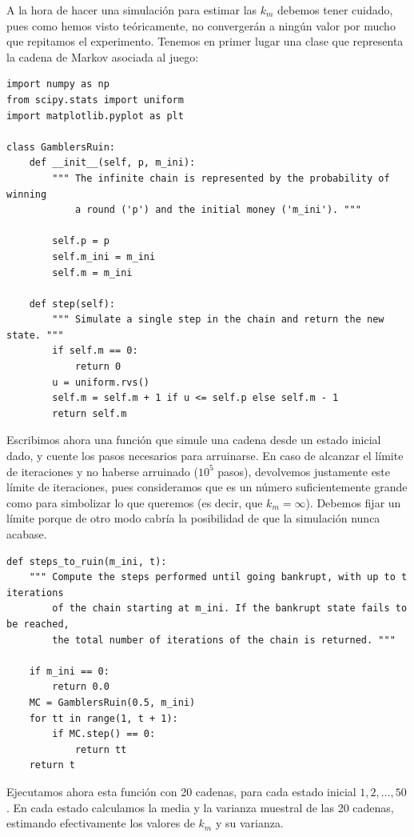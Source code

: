\documentclass[11pt,a4paper]{article}
\begin{document}
A la hora de hacer una simulación para estimar las $k_m$ debemos tener cuidado, pues como hemos visto teóricamente, no convergerán a ningún valor por mucho que repitamos el experimento. Tenemos en primer lugar una clase que representa la cadena de Markov asociada al juego:

\begin{verbatim}
import numpy as np
from scipy.stats import uniform
import matplotlib.pyplot as plt

class GamblersRuin:
    def __init__(self, p, m_ini):
        """ The infinite chain is represented by the probability of winning
            a round ('p') and the initial money ('m_ini'). """

        self.p = p
        self.m_ini = m_ini
        self.m = m_ini

    def step(self):
        """ Simulate a single step in the chain and return the new state. """
        if self.m == 0:
            return 0
        u = uniform.rvs()
        self.m = self.m + 1 if u <= self.p else self.m - 1
        return self.m
\end{verbatim}

Escribimos ahora una función que simule una cadena desde un estado inicial dado, y cuente los pasos necesarios para arruinarse. En caso de alcanzar el límite de iteraciones y no haberse arruinado ($10^5$ pasos), devolvemos justamente este límite de iteraciones, pues consideramos que es un número suficientemente grande como para simbolizar lo que queremos (es decir, que $k_m=\infty$). Debemos fijar un límite porque de otro modo cabría la posibilidad de que la simulación nunca acabase.

\begin{verbatim}
def steps_to_ruin(m_ini, t):
    """ Compute the steps performed until going bankrupt, with up to t iterations
        of the chain starting at m_ini. If the bankrupt state fails to be reached,
        the total number of iterations of the chain is returned. """

    if m_ini == 0:
        return 0.0
    MC = GamblersRuin(0.5, m_ini)
    for tt in range(1, t + 1):
        if MC.step() == 0:
            return tt
    return t
\end{verbatim}

Ejecutamos ahora esta función con 20 cadenas, para cada estado inicial $1,2,\dots, 50$. En cada estado calculamos la media y la varianza muestral de las 20 cadenas, estimando efectivamente los valores de $k_m$ y su varianza.
\end{document}
